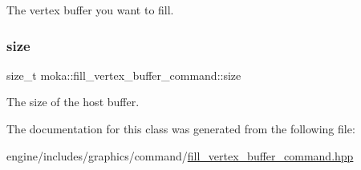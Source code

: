 The vertex buffer you want to fill. \mbox{\label{classmoka_1_1fill__vertex__buffer__command_acae9b5478cb4c11d7206d82d94246aa3}} 
\subsubsection{\texorpdfstring{size}{size}}
{\footnotesize\ttfamily size\+\_\+t moka\+::fill\+\_\+vertex\+\_\+buffer\+\_\+command\+::size}

The size of the host buffer. 

The documentation for this class was generated from the following file\+:\begin{DoxyCompactItemize}
\item 
engine/includes/graphics/command/\mbox{\hyperlink{fill__vertex__buffer__command_8hpp}{fill\+\_\+vertex\+\_\+buffer\+\_\+command.\+hpp}}\end{DoxyCompactItemize}
